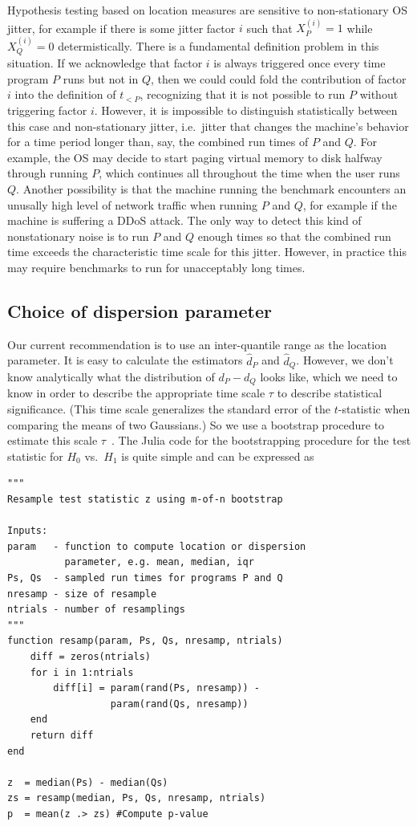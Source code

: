 \documentclass[conference]{IEEEtran}
\begin{document}
Hypothesis testing based on location measures are sensitive to non-stationary OS jitter, for example if there is some jitter factor $i$ such that $X^{(i)}_P = 1$ while $X^{(i)}_Q = 0$ determistically. There is a fundamental definition problem in this situation. If we acknowledge that factor $i$ is always triggered once every time program $P$ runs but not in $Q$, then we could could fold the contribution of factor $i$ into the definition of $t_{<P}$, recognizing that it is not possible to run $P$ without triggering factor $i$. However, it is impossible to distinguish statistically between this case and non-stationary jitter, i.e.\ jitter that changes the machine's behavior for a time period longer than, say, the combined run times of $P$ and $Q$. For example, the OS may decide to start paging virtual memory to disk halfway through running $P$, which continues all throughout the time when the user runs $Q$. Another possibility is that the machine running the benchmark encounters an unusally high level of network traffic when running $P$ and $Q$, for example if the machine is suffering a DDoS attack. The only way to detect this kind of nonstationary noise is to run $P$ and $Q$ enough times so that the combined run time exceeds the characteristic time scale for this jitter. However, in practice this may require benchmarks to run for unacceptably long times.


\subsection{Choice of dispersion parameter}

Our current recommendation is to use an inter-quantile range as the location parameter. It is easy to calculate the estimators $\hat d_P$ and $\hat d_Q$. However, we don't know analytically what the distribution of $d_P - d_Q$ looks like, which we need to know in order to describe the appropriate time scale $\tau$ to describe statistical significance. (This time scale generalizes the standard error of the $t$-statistic when comparing the means of two Gaussians.) So we use a bootstrap procedure to estimate this scale $\tau$~\cite{Chernick2008}. The Julia code for the bootstrapping procedure for the test statistic for $H_0$ vs.\ $H_1$ is quite simple and can be expressed as

\begin{lstlisting}
"""
Resample test statistic z using m-of-n bootstrap

Inputs:
param   - function to compute location or dispersion
          parameter, e.g. mean, median, iqr
Ps, Qs  - sampled run times for programs P and Q
nresamp - size of resample
ntrials - number of resamplings
"""
function resamp(param, Ps, Qs, nresamp, ntrials)
    diff = zeros(ntrials)
    for i in 1:ntrials
        diff[i] = param(rand(Ps, nresamp)) -
                  param(rand(Qs, nresamp))
    end
    return diff
end

z  = median(Ps) - median(Qs)
zs = resamp(median, Ps, Qs, nresamp, ntrials)
p  = mean(z .> zs) #Compute p-value
\end{lstlisting}
\end{document}

